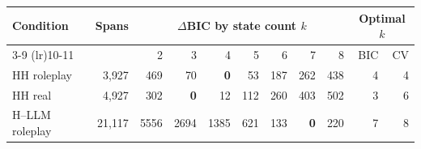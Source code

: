 \begin{tabular}{l r r r r r r r r r r}
\toprule
Condition & Spans & \multicolumn{7}{c}{$\Delta$BIC by state count $k$} & \multicolumn{2}{c}{Optimal $k$} \\
\cmidrule(lr){3-9} \cmidrule(lr){10-11}
 & & 2 & 3 & 4 & 5 & 6 & 7 & 8 & BIC & CV \\
\midrule
HH roleplay & 3{,}927 & 469 & 70 & \textbf{0} & 53 & 187 & 262 & 438 & 4 & 4 \\
HH real & 4{,}927 & 302 & \textbf{0} & 12 & 112 & 260 & 403 & 502 & 3 & 6 \\
H--LLM roleplay & 21{,}117 & 5556 & 2694 & 1385 & 621 & 133 & \textbf{0} & 220 & 7 & 8 \\
\bottomrule
\end{tabular}
